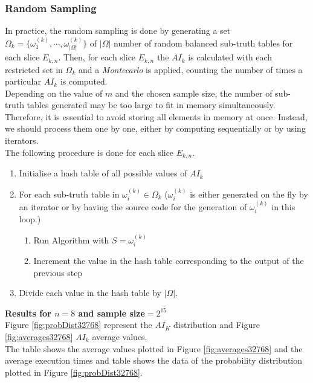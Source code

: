 \documentclass[11pt]{llncs}
\begin{document}
\subsubsection{Random Sampling}
In practice, the random sampling is done by generating a set $\Omega_k = \{\omega_1^{(k)}, \cdots, \omega_{|\Omega|}^{(k)}\}$ of $|\Omega|$ number of random balanced sub-truth tables for each slice $E_{k,n}$. Then, for each slice $E_{k,n}$ the $AI_k$ is calculated with each restricted set in $\Omega_k$ and a \textit{Montecarlo} is applied, counting the number of times a particular $AI_k$ is computed.\\
Depending on the value of $m$ and the chosen sample size, the number of sub-truth tables generated may be too large to fit in memory simultaneously. Therefore, it is essential to avoid storing all elements in memory at once. Instead, we should process them one by one, either by computing sequentially or by using iterators.\\ 

The following procedure is done for each slice $E_{k,n}$.
\begin{enumerate}
    \item Initialise a hash table of all possible values of $AI_k$
    \item For each sub-truth table in $\omega_i^{(k)} \in \Omega_k$ ($\omega_i^{(k)}$ is either generated on the fly by an iterator or by having the source code for the generation of $\omega_i^{(k)}$ in this loop.)
    \begin{enumerate}
        \item Run Algorithm  with $S=\omega_i^{(k)}$\\
        \item Increment the value in the hash table corresponding to the output of the previous step
    \end{enumerate}
    \item Divide each value in the hash table by $|\Omega|$.
\end{enumerate}

\textbf{Results for $n=8$ and sample size$=2^{15}$}\\
Figure \ref{fig:probDist32768} represent the $AI_K$ distribution and Figure \ref{fig:averages32768} $AI_k$ average values.\\
The table  shows the average values plotted in Figure \ref{fig:averages32768} and the average execution times and table  shows the data of the probability distribution plotted in Figure \ref{fig:probDist32768}.
\end{document}
